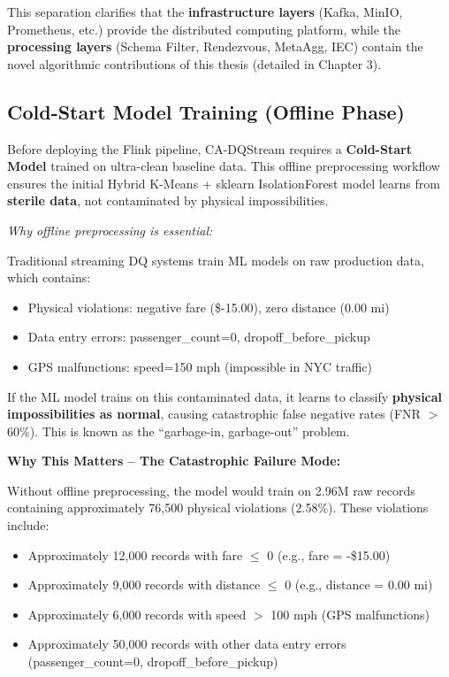 This separation clarifies that the \textbf{infrastructure layers} (Kafka, MinIO, Prometheus, etc.) provide the distributed computing platform, while the \textbf{processing layers} (Schema Filter, Rendezvous, MetaAgg, IEC) contain the novel algorithmic contributions of this thesis (detailed in Chapter 3).

\subsection{Cold-Start Model Training (Offline Phase)}

Before deploying the Flink pipeline, CA-DQStream requires a \textbf{Cold-Start Model} trained on ultra-clean baseline data. This offline preprocessing workflow ensures the initial Hybrid K-Means + sklearn IsolationForest model learns from \textbf{sterile data}, not contaminated by physical impossibilities.

\textit{Why offline preprocessing is essential:}

Traditional streaming DQ systems train ML models on raw production data, which contains:
\begin{itemize}
    \item Physical violations: negative fare (\$-15.00), zero distance (0.00 mi)
    \item Data entry errors: passenger\_count=0, dropoff\_before\_pickup
    \item GPS malfunctions: speed=150 mph (impossible in NYC traffic)
\end{itemize}

If the ML model trains on this contaminated data, it learns to classify \textbf{physical impossibilities as normal}, causing catastrophic false negative rates (FNR $>$ 60\%). This is known as the ``garbage-in, garbage-out'' problem.

\textbf{Why This Matters -- The Catastrophic Failure Mode:}

Without offline preprocessing, the model would train on 2.96M raw records containing approximately 76,500 physical violations (2.58\%). These violations include:
\begin{itemize}
    \item Approximately 12,000 records with fare $\leq$ 0 (e.g., fare = -\$15.00)
    \item Approximately 9,000 records with distance $\leq$ 0 (e.g., distance = 0.00 mi)
    \item Approximately 6,000 records with speed $>$ 100 mph (GPS malfunctions)
    \item Approximately 50,000 records with other data entry errors (passenger\_count=0, dropoff\_before\_pickup)
\end{itemize}

